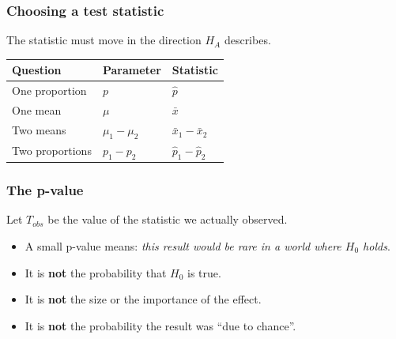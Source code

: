 \documentclass[slidestop,compress,mathserif]{beamer}
\begin{document}
\begin{frame}
\frametitle{Choosing a test statistic}

The statistic must move in the direction $H_A$ describes.

\vspace{0.3em}
\begin{center}
\begin{tabular}{lll}
\toprule
Question & Parameter & Statistic \\
\midrule
One proportion & $p$ & $\widehat{p}$ \\
One mean & $\mu$ & $\bar{x}$ \\
Two means & $\mu_1-\mu_2$ & $\bar{x}_1-\bar{x}_2$ \\
Two proportions & $p_1-p_2$ & $\widehat{p}_1-\widehat{p}_2$ \\
\bottomrule
\end{tabular}
\end{center}

\vspace{0.5em}

\end{frame}
\begin{frame}
\frametitle{The p-value}

Let $T_{obs}$ be the value of the statistic we actually observed.


\begin{itemize}
\item A small p-value means: \emph{this result would be rare in a world where $H_0$ holds}.
\pause
\item It is \textbf{not} the probability that $H_0$ is true.
\item It is \textbf{not} the size or the importance of the effect.
\item It is \textbf{not} the probability the result was ``due to chance''.
\end{itemize}

\end{frame}
\end{document}
